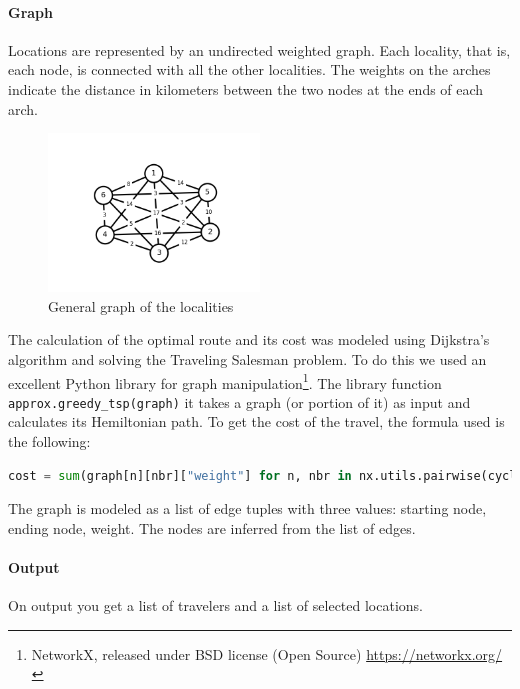 \documentclass{article}
\begin{document}
\paragraph*{Graph}
Locations are represented by an undirected weighted graph. Each locality, that is, each node, is connected with all the other localities. The weights on the arches indicate the distance in kilometers between the two nodes at the ends of each arch.
\begin{figure}[h]
  \centering
  \includegraphics[width=0.50\textwidth]{img/graphTot.png}
  \caption{General graph of the localities}\label{fig:graphTot.png}
\end{figure}
The calculation of the optimal route and its cost was modeled using Dijkstra's algorithm and solving the Traveling Salesman problem. To do this we used an excellent Python library for graph manipulation\footnote{NetworkX, released under BSD license (Open Source) \url{https://networkx.org/}}. The library function \verb|approx.greedy_tsp(graph)| it takes a graph (or portion of it) as input and calculates its Hemiltonian path.
To get the cost of the travel, the formula used is the following:
\begin{lstlisting}[language=Python]
cost = sum(graph[n][nbr]["weight"] for n, nbr in nx.utils.pairwise(cycle))
\end{lstlisting}
The graph is modeled as a list of edge tuples with three values: starting node, ending node, weight.
The nodes are inferred from the list of edges.
\paragraph*{Output}
On output you get a list of travelers and a list of selected locations.
\end{document}
